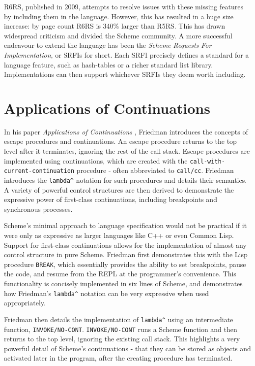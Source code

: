 \documentclass[11pt]{article}
\begin{document}
R6RS, published in 2009, attempts to resolve issues with these missing features by including them in the language. However, this has resulted in a huge size increase: by page count R6RS is 340\% larger than R5RS. This has drawn widespread criticism and divided the Scheme community. A more successful endeavour to extend the language has been the \emph{Scheme Requests For Implementation}, or SRFIs for short. Each SRFI precisely defines a standard for a language feature, such as hash-tables or a richer standard list library. Implementations can then support whichever SRFIs they deem worth including.

\section{Applications of Continuations}
\label{sec:org444eda5}
In his paper \emph{Applications of Continuations} \cite{friedman1988applications}, Friedman introduces the concepts of escape procedures and continuations. An escape procedure returns to the top level after it terminates, ignoring the rest of the call stack. Escape procedures are implemented using continuations, which are created with the \texttt{call-with-current-continuation} procedure - often abbreviated to \texttt{call/cc}. Friedman introduces the \texttt{lambda\textasciicircum{}} notation for such procedures and details their semantics. A variety of powerful control structures are then derived to demonstrate the expressive power of first-class continuations, including breakpoints and synchronous processes.

Scheme's minimal approach to language specification would not be practical if it were only as expressive as larger languages like C++ or even Common Lisp. Support for first-class continuations allows for the implementation of almost any control structure in pure Scheme. Friedman first demonstrates this with the Lisp procedure \texttt{BREAK}, which essentially provides the ability to set breakpoints, pause the code, and resume from the REPL at the programmer's convenience. This functionality is concisely implemented in six lines of Scheme, and demonstrates how Friedman's \texttt{lambda\textasciicircum{}} notation can be very expressive when used appropriately.

Friedman then details the implementation of \texttt{lambda\textasciicircum{}} using an intermediate function, \texttt{INVOKE/NO-CONT}. \texttt{INVOKE/NO-CONT} runs a Scheme function and then returns to the top level, ignoring the existing call stack. This highlights a very powerful detail of Scheme's continuations - that they can be stored as objects and activated later in the program, after the creating procedure has terminated.
\end{document}
